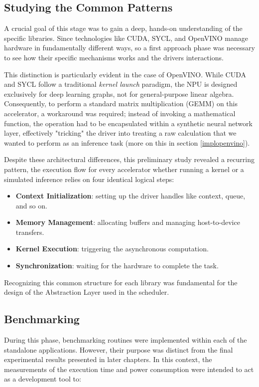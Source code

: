 \subsection{Studying the Common Patterns}
A crucial goal of this stage was to gain a deep, hands-on understanding of the specific libraries. Since technologies like CUDA, SYCL, and OpenVINO manage hardware in fundamentally different ways, so a first approach phase was necessary to see how their specific mechanisms works and the drivers interactions.

This distinction is particularly evident in the case of OpenVINO. While CUDA and SYCL follow a traditional \textit{kernel launch} paradigm, the NPU is designed exclusively for deep learning graphs, not for general-purpose linear algebra. Consequently, to perform a standard matrix multiplication (GEMM) on this accelerator, a workaround was required; instead of invoking a mathematical function, the operation had to be encapsulated within a synthetic neural network layer, effectively "tricking" the driver into treating a raw calculation that we wanted to perform as an inference task (more on this in section \ref{implopenvino}).

Despite these architectural differences, this preliminary study revealed a recurring pattern, the execution flow for every accelerator whether running a kernel or a simulated inference relies on four identical logical steps:

\begin{itemize}
    \item \textbf{Context Initialization}: setting up the driver handles like context, queue, and so on.
    \item \textbf{Memory Management}: allocating buffers and managing host-to-device transfers.
    \item \textbf{Kernel Execution}: triggering the asynchronous computation.
    \item \textbf{Synchronization}: waiting for the hardware to complete the task.
\end{itemize}

Recognizing this common structure for each library was fundamental for the design of the Abstraction Layer used in the scheduler.

\subsection{Benchmarking}
During this phase, benchmarking routines were implemented within each of the standalone applications. However, their purpose was distinct from the final experimental results presented in later chapters. In this context, the measurements of the execution time and power consumption were intended to act as a development tool to:

